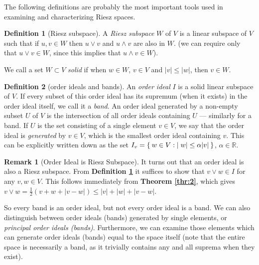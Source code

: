 \documentclass[letterpaper,10pt,oneside,onecolumn,reqno]{amsart}
\newcommand{\R}{\mathbb R}
\theoremstyle{definition}
\newtheorem{defn}{Definition}
\newtheorem{rem}{Remark}
\newcommand{\meet}{\wedge}
\newcommand{\join}{\vee}
\begin{document}
The following definitions are probably the most important tools used
in examining and characterizing Riesz spaces.

  \begin{defn}[Riesz subspace]\label{def:7}
    A \emph{Riesz subspace} $W$ of $V$ is a
    linear subspace of $V$ such that if $u,v \in W$ then $u \join v$
    and $u \meet v$ are also in $W$. (we can require only that $u
    \join v \in W$, since this implies that $u \meet v \in W$).
  \end{defn}
  We call a set $W \subset V$ \emph{solid} if when $w \in W$, $v \in
  V$ and $|v| \leq |w|$, then $v \in W$.

  \begin{defn}[order ideals and bands]\label{def:8}
    An \emph{order ideal} $I$ is a solid linear
    subspace of $V$. If every subset of this order ideal has its
    supremum (when it exists) in the order ideal itself, we call it a
    \emph{band}. An order ideal generated by a non-empty
    subset $U$ of $V$ is the intersection of all order ideals
    containing $U$ --- similarly for a band. If $U$ is the set
    consisting of a single element $v \in V$, we say that the order
    ideal is \emph{generated} by $v \in V$, which is the smallest
    order ideal containing $v$. This can be explicitly written down as
    the set $I_{v} = \Set{w \in V: |w| \leq \alpha |v|}$, $\alpha \in
    \R$.
  \end{defn}

  \begin{rem}[Order Ideal is Riesz Subspace]\label{rem:1}
    It turns out that an order ideal is also a Riesz subspace. From
    \textbf{Definition \ref{def:7}} it suffices to show that $v \join
    w \in I$ for any $v,w \in V$. This follows immediately from
    \textbf{Theorem \ref{thr:2}}, which gives $v \join w =
    \frac{1}{2}(v+w+|v-w|) \leq |v| + |w| + |v - w|$.
  \end{rem}

  So every band is an order ideal, but not every order ideal is a
  band. We can also distinguish between order ideals (bands) generated
  by single elements, or \emph{principal order ideals
    (bands)}. Furthermore, we can examine those elements which can
  generate order ideals (bands) equal to the space itself (note that
  the entire space is necessarily a band, as it trivially contains any
  and all suprema when they exist).
\end{document}
